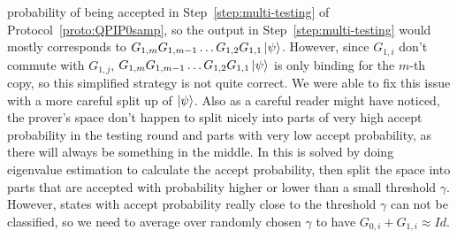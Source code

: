  probability of being accepted in Step~\ref{step:multi-testing} of Protocol~\ref{proto:QPIP0samp}, so the output in  Step~\ref{step:multi-testing} would mostly corresponds to $G_{1,m} G_{1,m-1}\dots G_{1,2}G_{1,1}\ket{\psi}$. However, since $G_{1,i}$ don't commute with $G_{1,j}$, $G_{1,m} G_{1,m-1}\dots G_{1,2}G_{1,1}\ket{\psi}$ is only binding for the $m$-th copy, so this simplified strategy is not quite correct. We were able to fix this issue with a more careful split up of $\ket{\psi}$. Also as a careful reader might have noticed, the prover's space don't happen to split nicely into parts of very high accept probability in the testing round and parts with very low accept probability, as there will always be something in the middle. In \cite{arXiv:ChiaChungYam19} this is solved by doing eigenvalue estimation to calculate the accept probability, then split the space into parts that are accepted with probability higher or lower than a small threshold $\gamma$. However, states with accept probability really close to the threshold $\gamma$ can not be classified, so we need to average over randomly chosen $\gamma$ to have $G_{0,i}+G_{1,i} \approx Id$.




